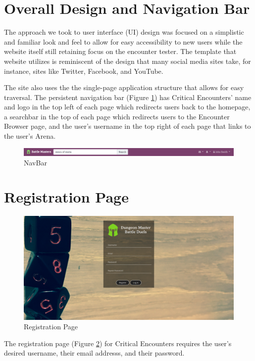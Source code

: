 \documentclass[12pt,a4paper]{report}
\begin{document}
	\section{Overall Design and Navigation Bar}
	The approach we took to user interface (UI) design was focused on a simplistic and familiar look and feel to allow for easy accessibility to new users while the website itself still retaining focus on the encounter tester. The template that website utilizes is reminiscent of the design that many social media sites take, for instance, sites like Twitter, Facebook, and YouTube.\par
	The site also uses the the single-page application structure that allows for easy traversal. The persistent navigation bar (Figure \ref{fig: NavBar}) has Critical Encounters' name and logo in the top left of each page which redirects users back to the homepage, a searchbar in the top of each page which redirects users to the Encounter Browser page, and the user's username in the top right of each page that links to the user's Arena.
	\bigskip
	\bigskip
	\begin{figure}[!h]
		\centering
		\centerline{\includegraphics[scale=.30]{NavBar}}
		\caption{NavBar}
		\label{fig: NavBar}
	\end{figure}
	\section{Registration Page}
	\begin{figure}
		\centering
		\includegraphics[scale=.20]{register}
		\caption{Registration Page}
		\label{fig: Registration Page}
	\end{figure}
	The registration page (Figure \ref{fig: Registration Page})  for Critical Encounters requires the user's desired username, their email addresss, and their password.
\end{document}
